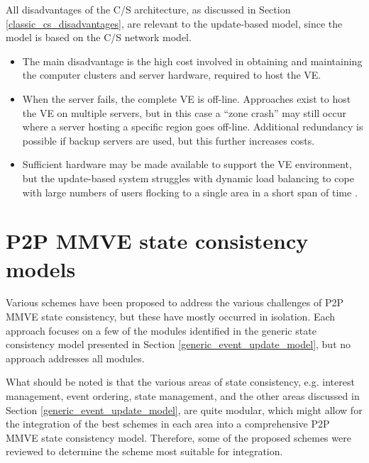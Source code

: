 All disadvantages of the C/S architecture, as discussed in Section \ref{classic_cs_disadvantages}, are relevant to the update-based model, since the model is based on the C/S network model.
%
\begin{itemize}
\item The main disadvantage is the high cost involved in obtaining and maintaining the computer clusters and server hardware, required to host the VE.

\item When the server fails, the complete VE is off-line. Approaches exist to host the VE on multiple servers, but in this case a ``zone crash'' may still occur where a server hosting a specific region goes off-line. Additional redundancy is possible if backup servers are used, but this further increases costs.

\item Sufficient hardware may be made available to support the VE environment, but the update-based system struggles with dynamic load balancing to cope with large numbers of users flocking to a single area in a short span of time \cite{flocking}.
\end{itemize}

\section{P2P MMVE state consistency models}
\label{p2p_mmve_state_consistency}

Various schemes have been proposed to address the various challenges of P2P MMVE state consistency, but these have mostly occurred in isolation. Each approach focuses on a few of the modules identified in the generic state consistency model presented in Section \ref{generic_event_update_model}, but no approach addresses all modules.

What should be noted is that the various areas of state consistency, e.g. interest management, event ordering, state management, and the other areas discussed in Section \ref{generic_event_update_model}, are quite modular, which might allow for the integration of the best schemes in each area into a comprehensive P2P MMVE state consistency model. Therefore, some of the proposed schemes were reviewed to determine the scheme most suitable for integration.


